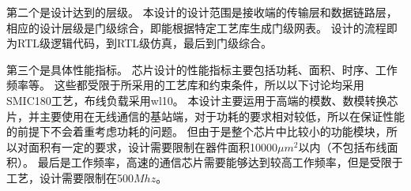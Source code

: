 \documentclass[UTF8]{ctexart}
\begin{document}
第二个是设计达到的层级。
本设计的设计范围是接收端的传输层和数据链路层，相应的设计层级是门级综合，即能根据特定工艺库生成门级网表。
设计的流程即为RTL级逻辑代码，到RTL级仿真，最后到门级综合。

第三个是具体性能指标。
芯片设计的性能指标主要包括功耗、面积、时序、工作频率等。
这些都受限于所采用的工艺库和约束条件，所以以下讨论均采用SMIC180工艺，布线负载采用wl10。
本设计主要运用于高端的模数、数模转换芯片，并主要使用在无线通信的基站端，对于功耗的要求相对较低，所以在保证性能的前提下不会着重考虑功耗的问题。
但由于是整个芯片中比较小的功能模块，所以对面积有一定的要求，设计需要限制在器件面积10000$\mu m^2$以内（不包括布线面积）。
最后是工作频率，高速的通信芯片需要能够达到较高工作频率，但是受限于工艺，设计需要限制在500$Mhz$。


\end{document}
